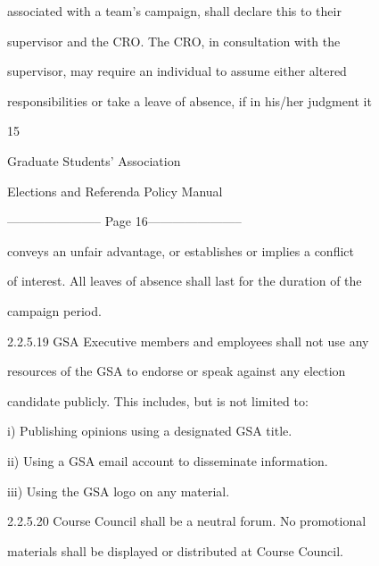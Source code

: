               associated  with  a  team’s  campaign,  shall  declare  this  to  their  

              supervisor  and  the  CRO.  The  CRO,  in  consultation  with  the  

              supervisor,  may  require  an  individual  to  assume  either  altered  

              responsibilities or take a leave of absence, if in his/her judgment it  



                                                    15  

                                                                                                         

                              Graduate Students’ Association  

                         Elections and Referenda Policy Manual  

  


----------------------- Page 16-----------------------

               conveys an unfair advantage, or establishes or implies a  conflict  

               of interest. All leaves of absence shall last for the duration of the  

               campaign period.   

  

2.2.5.19       GSA   Executive   members   and   employees   shall   not   use   any  

               resources  of  the  GSA  to  endorse  or  speak  against  any  election  

               candidate publicly. This includes, but is not limited to:   

  

                  i)       Publishing opinions using a designated GSA title.  

  

                  ii)      Using a GSA email account to disseminate information.   

  

                  iii)     Using the GSA logo on any material.   

  

2.2.5.20       Course   Council   shall   be   a   neutral   forum.   No   promotional  

               materials shall be displayed or distributed at Course Council.   


